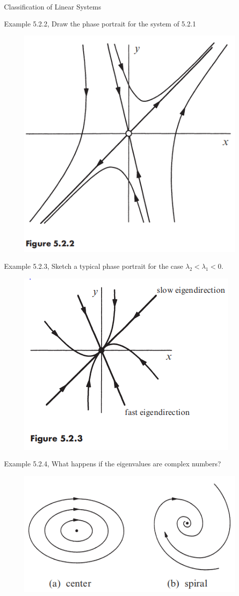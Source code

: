 \documentclass[9pt,aspectratio=43,mathserif,table]{beamer}
\begin{document}
\begin{frame}{Classification of Linear Systems}
  \begin{multicols}{2}

    Example 5.2.2,
    Draw the phase portrait for the system of 5.2.1
        \begin{figure}[!h]
          \centering
          \includegraphics[width=.2\textwidth]{fig/5.2.2.png}
        \end{figure}

  Example 5.2.3,
  Sketch a typical phase portrait for the case $\lambda_2 < \lambda_1<0$.
    \begin{figure}[!h]
      \centering
      \includegraphics[width=.2\textwidth]{fig/5.2.3.png}
    \end{figure}

  Example 5.2.4,
  What happens if the eigenvalues are complex numbers?
    \begin{figure}[!h]
      \centering
      \includegraphics[width=.5\textwidth]{fig/5.2.4.png}
    \end{figure}


  \end{multicols}
\end{frame}
\end{document}
